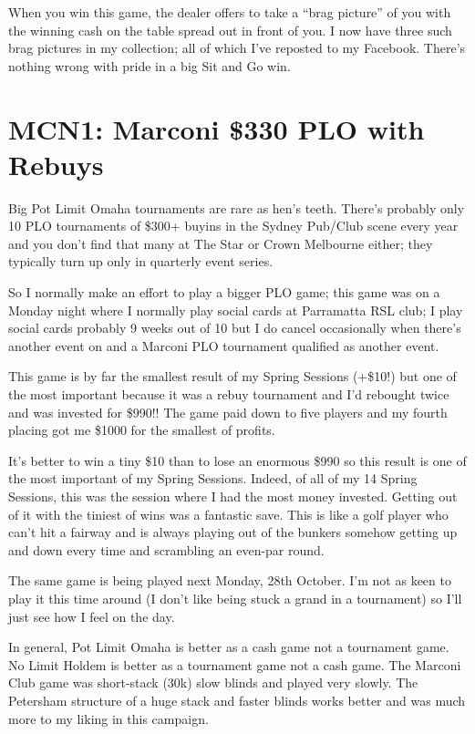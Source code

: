 When you win this game, the dealer offers to take a ``brag picture''
of you with the winning cash on the table spread out in front of
you. I now have three such brag pictures in my collection; all of which
I've reposted to my Facebook. There's nothing wrong with
pride in a big Sit and Go win.

\section*{MCN1: Marconi \$330 PLO with Rebuys}

Big Pot Limit Omaha tournaments are rare as hen's teeth. There's
probably only 10 PLO tournaments of \$300+ buyins in the Sydney
Pub/Club scene every year and you don't find that many at The Star or
Crown Melbourne either; they typically turn up only in quarterly event
series.

So I normally make an effort to play a bigger PLO game; this game was
on a Monday night where I normally play social cards at Parramatta RSL
club; I play social cards probably 9 weeks out of 10 but I do cancel
occasionally when there's another event on and a Marconi PLO
tournament qualified as another event.

This game is by far the smallest result of my Spring Sessions (+\$10!)
but one of the most important because it was a rebuy tournament and
I'd rebought twice and was invested for \$990!! The game paid down to
five players and my fourth placing got me \$1000 for the smallest of
profits.

It's better to win a tiny \$10 than to lose an enormous \$990 so this
result is one of the most important of my Spring Sessions. Indeed,
of all of my 14 Spring Sessions, this was the session where I had the
most money invested. Getting out of it with the tiniest of wins was a
fantastic save. This is like a golf player who can't hit a fairway and
is always playing out of the bunkers somehow getting up and down every
time and scrambling an even-par round.

The same game is being played next Monday, 28th October. I'm not as
keen to play it this time around (I don't like being stuck a grand in
a tournament) so I'll just see how I feel on the day.

In general, Pot Limit Omaha is better as a cash game not a tournament
game. No Limit Holdem is better as a tournament game not a cash game.
The Marconi Club game was short-stack (30k) slow blinds and played
very slowly. The Petersham structure of a huge stack and faster blinds
works better and was much more to my liking in this campaign.

